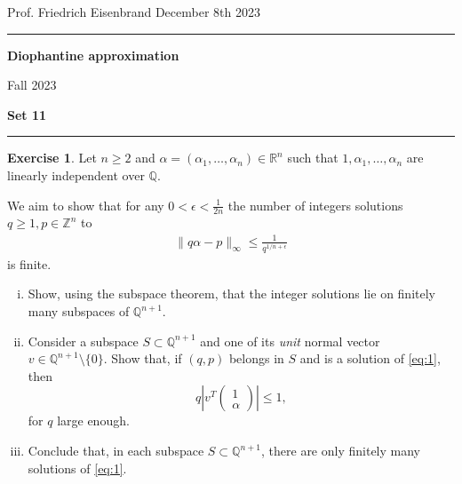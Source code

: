 \documentclass[12pt,a4paper]{article}
\date{}
\theoremstyle{plain}
\newtheorem*{Sol*}{Solution}
\theoremstyle{definition}
\newtheorem{Ex}{Exercise}
\def \Q {\mathbb Q}
\def \R {\mathbb R}
\def \Z {\mathbb Z}
\newif\ifsolutions
\newcommand{\exercise}[2]{
			\begin{Ex} #1 \end{Ex}
			\ifsolutions  \begin{Sol*} #2 \end{Sol*} \bigskip \else \bigskip  \fi
		}
\begin{document}
\begin{center}
{Prof. Friedrich Eisenbrand \hfill December 8th 2023}
\end{center}
	
\hrule\vspace{\baselineskip}

\begin{center}
\textbf{Diophantine approximation}

Fall 2023

\bigskip

\textbf{Set 11}
\ifsolutions{\textbf{- Solutions}} \else{} \fi
\end{center}

\hrule\vspace{\baselineskip}







\exercise{
	Let $n\geq2$ and $\alpha = (\alpha_1, \dots, \alpha_n) \in \R^n$ such that $1, \alpha_1, \dots, \alpha_n$ are linearly independent over $\Q$.

	We aim to show that for any $0 < \epsilon < \frac{1}{2n}$ the number of integers solutions $q\geq1, p\in\Z^n$ to
		\begin{gather}
			 \| q \alpha - p \|_\infty \leq \frac{1}{q^{1/n + \epsilon}} \label{eq:1}
		\end{gather}
	is finite.

	\begin{enumerate}[i)]
		\item Show, using the subspace theorem, that the integer solutions lie on finitely many subspaces of $\Q^{n+1}$.

		\item Consider a subspace $S \subset \Q^{n+1}$ and one of its \emph{unit} normal vector $v \in \Q^{n+1} \setminus\{0\}$.
			Show that, if $(q, p)$ belongs in $S$ and is a solution of \eqref{eq:1}, then
				\[ q \left| v^T \begin{pmatrix}1 \\ \alpha \end{pmatrix} \right| \leq 1, \]
			for $q$ large enough.
		
		\item Conclude that, in each subspace $S \subset \Q^{n+1}$, there are only finitely many solutions of \eqref{eq:1}.
	\end{enumerate}
}
{}
\end{document}
